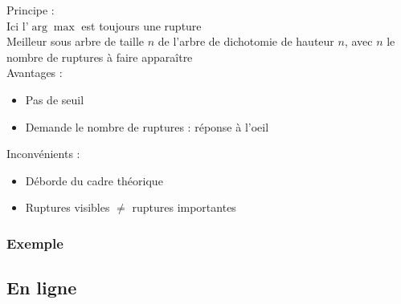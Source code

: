 \documentclass{beamer}
\begin{document}
\begin{frame}

	Principe :
	\vspace{.25cm}
	\\
	Ici l'$\arg\max$ est toujours une rupture
	\\
	Meilleur sous arbre de taille $n$ de l'arbre de dichotomie de hauteur $n$, avec $n$ le nombre de ruptures à faire apparaître
	\\
	\phantom{caca}
	Avantages :

	\begin{itemize}
		
		\item Pas de seuil
		
		\item Demande le nombre de ruptures : réponse à l'oeil
		
	\end{itemize}

	Inconvénients :
	
	\begin{itemize}
	
		\item Déborde du cadre théorique
		
		\item Ruptures visibles $\ne$ ruptures importantes
	
	\end{itemize}

\end{frame}

\begin{frame}
\frametitle{Exemple}
\end{frame}

\subsection{En ligne}
\end{document}
